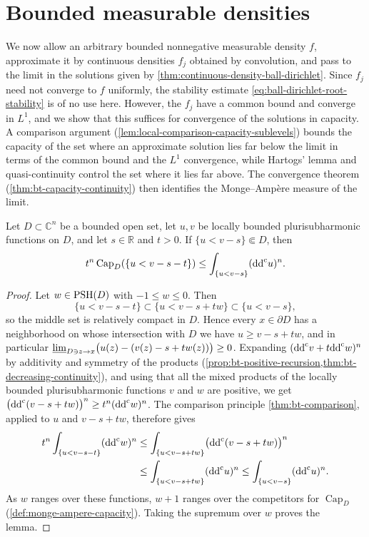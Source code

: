 \section{Bounded measurable densities}
\label{sec:bt-measurable-ball-dirichlet}

We now allow an arbitrary bounded nonnegative measurable density $f$, approximate it by continuous densities $f_j$ obtained by convolution, and pass to the limit in the solutions given by \cref{thm:continuous-density-ball-dirichlet}. Since $f_j$ need not converge to $f$ uniformly, the stability estimate \eqref{eq:ball-dirichlet-root-stability} is of no use here. However, the $f_j$ have a common bound and converge in $L^1$, and we show that this suffices for convergence of the solutions in capacity. A comparison argument (\cref{lem:local-comparison-capacity-sublevels}) bounds the capacity of the set where an approximate solution lies far below the limit in terms of the common bound and the $L^1$ convergence, while Hartogs' lemma and quasi-continuity control the set where it lies far above. The convergence theorem (\cref{thm:bt-capacity-continuity}) then identifies the Monge--Amp\`ere measure of the limit.

\begin{lemma}\label{lem:local-comparison-capacity-sublevels}
Let $D\subset\mathbb C^n$ be a bounded open set, let $u,v$ be locally bounded plurisubharmonic functions on $D$, and let $s\in\mathbb R$ and $t>0$. If $\{u<v-s\}\Subset D$, then
\[
 t^n\operatorname{Cap}_D(\{u<v-s-t\})
 \le\int_{\{u<v-s\}}(\mathrm{dd}^{\mathrm{c}} u)^n.
\]
\end{lemma}
\begin{proof}
Let $w\in\mathrm{PSH}(D)$ with $-1\le w\le0$. Then
\[
 \{u<v-s-t\}\subset\{u<v-s+tw\}\subset\{u<v-s\},
\]
so the middle set is relatively compact in $D$. Hence every $x\in\partial D$ has a neighborhood on whose intersection with $D$ we have $u\ge v-s+tw$, and in particular $\varliminf_{D\ni z\to x}\bigl(u(z)-(v(z)-s+tw(z))\bigr)\ge0$. Expanding $(\mathrm{dd}^{\mathrm{c}} v+t\mathrm{dd}^{\mathrm{c}} w)^n$ by additivity and symmetry of the products (\cref{prop:bt-positive-recursion,thm:bt-decreasing-continuity}), and using that all the mixed products of the locally bounded plurisubharmonic functions $v$ and $w$ are positive, we get $\bigl(\mathrm{dd}^{\mathrm{c}}(v-s+tw)\bigr)^n\ge t^n(\mathrm{dd}^{\mathrm{c}} w)^n$. The comparison principle \cref{thm:bt-comparison}, applied to $u$ and $v-s+tw$, therefore gives
\[
 \begin{aligned}
 t^n\int_{\{u<v-s-t\}}(\mathrm{dd}^{\mathrm{c}} w)^n
 &\le\int_{\{u<v-s+tw\}}\bigl(\mathrm{dd}^{\mathrm{c}}(v-s+tw)\bigr)^n\\
 &\le\int_{\{u<v-s+tw\}}(\mathrm{dd}^{\mathrm{c}} u)^n
 \le\int_{\{u<v-s\}}(\mathrm{dd}^{\mathrm{c}} u)^n.
 \end{aligned}
\]
As $w$ ranges over these functions, $w+1$ ranges over the competitors for $\operatorname{Cap}_D$ (\cref{def:monge-ampere-capacity}). Taking the supremum over $w$ proves the lemma.
\end{proof}

